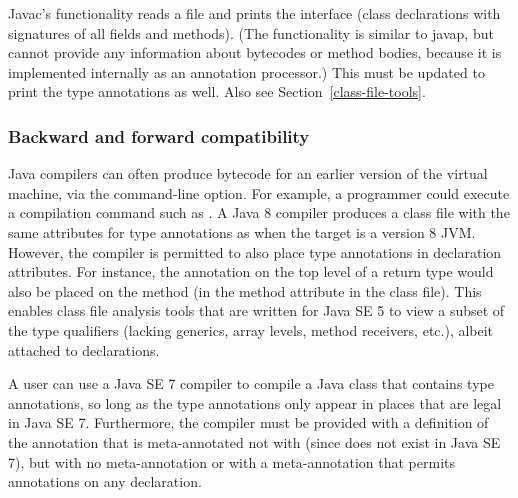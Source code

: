 \documentclass[10pt]{article}
\begin{document}


Javac's  functionality reads a  file and prints
the interface (class declarations with signatures of all fields and
methods).  (The  functionality is similar to javap, but
cannot provide
any information about bytecodes or method bodies, because it is implemented
internally as an annotation processor.)
This must be updated to print the type annotations as well.
Also see Section~\ref{class-file-tools}.



\subsubsection{Backward and forward compatibility\label{mods-compatibility}}

Java compilers can often produce bytecode for an earlier version of the
virtual machine, via the  command-line option.  For example,
a programmer could execute a compilation command such as .  A Java 8 compiler produces a class file
with the same attributes for type annotations as when the target is a
version 8 JVM\@.  However, the compiler is permitted to also place type
annotations in declaration attributes.  For instance, the annotation on the
top level of a return type would also be placed on the method (in the
method attribute in the class file).  This enables class file analysis
tools that are written for Java SE 5 to view a subset of the type
qualifiers (lacking generics, array levels, method receivers, etc.), albeit
attached to declarations.

A user can use a Java SE 7 compiler to compile a Java class that contains
type annotations, so long as the type annotations only appear in places
that are legal in Java SE 7.  Furthermore, the compiler must be provided
with a definition of the annotation that is meta-annotated not with
 (since 
does not exist in Java SE 7), but with no meta-annotation or with a
meta-annotation that permits annotations on any declaration.
\end{document}
